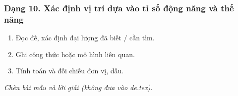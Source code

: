 \subsubsection{Dạng 10. Xác định vị trí dựa vào tỉ số động năng và thế năng}
\begin{phuongphap}
\begin{enumerate}
\item Đọc đề, xác định đại lượng đã biết / cần tìm.
\item Ghi công thức hoặc mô hình liên quan.
\item Tính toán và đối chiếu đơn vị, dấu.
\end{enumerate}
\end{phuongphap}
\begin{vidumau}
\textit{Chèn bài mẫu và lời giải (không đưa vào de.tex).}
\end{vidumau}

